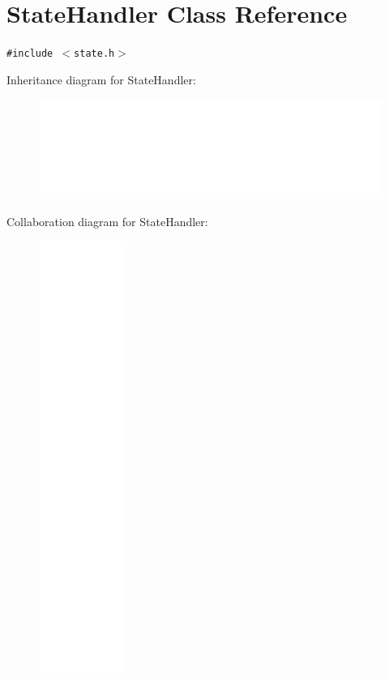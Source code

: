 \hypertarget{classStateHandler}{
\section{StateHandler Class Reference}
\label{classStateHandler}
}
{\tt \#include $<$state.h$>$}

Inheritance diagram for StateHandler:\nopagebreak
\begin{figure}[H]
\begin{center}
\leavevmode
\includegraphics[width=400pt]{classStateHandler__inherit__graph}
\end{center}
\end{figure}
Collaboration diagram for StateHandler:\nopagebreak
\begin{figure}[H]
\begin{center}
\leavevmode
\includegraphics[height=400pt]{classStateHandler__coll__graph}
\end{center}
\end{figure}
